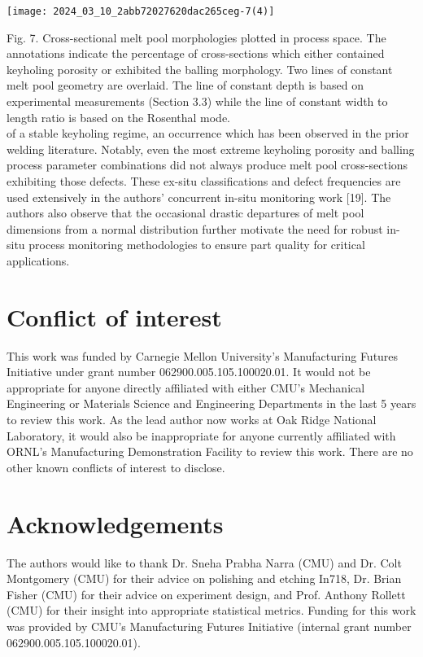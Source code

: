 \documentclass[10pt]{article}
\begin{document}
\begin{center}
\texttt{[image: 2024\_03\_10\_2abb72027620dac265ceg-7(4)]}
\end{center}

Fig. 7. Cross-sectional melt pool morphologies plotted in process space. The annotations indicate the percentage of cross-sections which either contained keyholing porosity or exhibited the balling morphology. Two lines of constant melt pool geometry are overlaid. The line of constant depth is based on experimental measurements (Section 3.3) while the line of constant width to length ratio is based on the Rosenthal mode.\\
of a stable keyholing regime, an occurrence which has been observed in the prior welding literature. Notably, even the most extreme keyholing porosity and balling process parameter combinations did not always produce melt pool cross-sections exhibiting those defects. These ex-situ classifications and defect frequencies are used extensively in the authors' concurrent in-situ monitoring work [19]. The authors also observe that the occasional drastic departures of melt pool dimensions from a normal distribution further motivate the need for robust in-situ process monitoring methodologies to ensure part quality for critical applications.

\section*{Conflict of interest}
This work was funded by Carnegie Mellon University's Manufacturing Futures Initiative under grant number 062900.005.105.100020.01. It would not be appropriate for anyone directly affiliated with either CMU's Mechanical Engineering or Materials Science and Engineering Departments in the last 5 years to review this work. As the lead author now works at Oak Ridge National Laboratory, it would also be inappropriate for anyone currently affiliated with ORNL's Manufacturing Demonstration Facility to review this work. There are no other known conflicts of interest to disclose.

\section*{Acknowledgements}
The authors would like to thank Dr. Sneha Prabha Narra (CMU) and Dr. Colt Montgomery (CMU) for their advice on polishing and etching In718, Dr. Brian Fisher (CMU) for their advice on experiment design, and Prof. Anthony Rollett (CMU) for their insight into appropriate statistical metrics. Funding for this work was provided by CMU's Manufacturing Futures Initiative (internal grant number 062900.005.105.100020.01).
\end{document}
